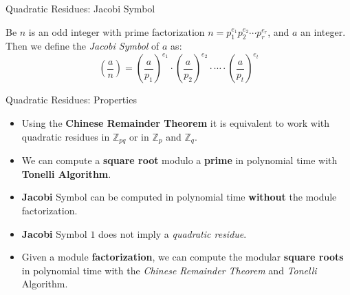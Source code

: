 \documentclass{beamer}
\begin{document}
\begin{frame}{Quadratic Residues: Jacobi Symbol}
\begin{definition}
	Be $n$ is an odd integer with prime factorization $n = p_1^{e_1} p_2^{e_2} \cdots p_r^{e_r}$, and $a$ an integer. Then we define the \textit{Jacobi Symbol} of $a$ as:
	\[\left( \dfrac{a}{n} \right) = \left( \dfrac{a}{p_1} \right)^{e_1} \cdot \left( \dfrac{a}{p_2} \right)^{e_2} \cdot \cdots \cdot \left( \dfrac{a}{p_t} \right)^{e_t}\]
\end{definition}
\end{frame}



\begin{frame}{Quadratic Residues: Properties}
\begin{itemize}
	\item Using the \textbf{Chinese Remainder Theorem} it is equivalent to work with quadratic residues in ${\mathbb Z}_{pq}$ or in ${\mathbb Z}_p$ and ${\mathbb Z}_q$.
	\item We can compute a \textbf{square root} modulo a \textbf{prime} in polynomial time with \textbf{Tonelli Algorithm}.
	\item \textbf{Jacobi} Symbol can be computed in polynomial time \textbf{without} the module factorization.
	\item \textbf{Jacobi} Symbol $1$ does not imply a \textit{quadratic residue}.
	\item Given a module \textbf{factorization}, we can compute the modular \textbf{square roots} in polynomial time with the \textit{Chinese Remainder Theorem} and \textit{Tonelli} Algorithm.
\end{itemize}
\end{frame}
\end{document}
